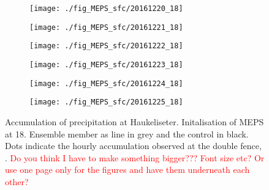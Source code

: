 \begin{figure}[t]
	\centering
    \begin{subfigure}[b]{0.49\textwidth}
        \texttt{[image: ./fig\_MEPS\_sfc/20161220\_18]}
        \caption{}\label{fig:acc20}
    \end{subfigure}
    \hfill
    \begin{subfigure}[b]{0.49\textwidth}
        \texttt{[image: ./fig\_MEPS\_sfc/20161221\_18]}
        \caption{}\label{fig:acc21}
    \end{subfigure}
    \begin{subfigure}[b]{0.49\textwidth}
        \texttt{[image: ./fig\_MEPS\_sfc/20161222\_18]}
        \caption{}\label{fig:acc22}
    \end{subfigure}
    \hfill
    \begin{subfigure}[b]{0.49\textwidth}
        \texttt{[image: ./fig\_MEPS\_sfc/20161223\_18]}
        \caption{}\label{fig:acc23}
    \end{subfigure}
    \begin{subfigure}[b]{0.49\textwidth}
        \texttt{[image: ./fig\_MEPS\_sfc/20161224\_18]}
        \caption{}\label{fig:acc24}
    \end{subfigure}
    \hfill
    \begin{subfigure}[b]{0.49\textwidth}
        \texttt{[image: ./fig\_MEPS\_sfc/20161225\_18]}
        \caption{}\label{fig:acc25}
    \end{subfigure}
    \caption{Accumulation of precipitation at Haukeliseter. Initalisation of MEPS at \SI{18}{\UTC}. Ensemble member as line in grey and the control in black. Dots indicate the hourly accumulation observed at the double fence, \citep{eklima_norwegian_2016}. \textcolor{red}{Do you think I have to make something bigger??? Font size etc? Or use one page only for the figures and have them underneath each other?} } \label{fig:acc20_25}
\end{figure}